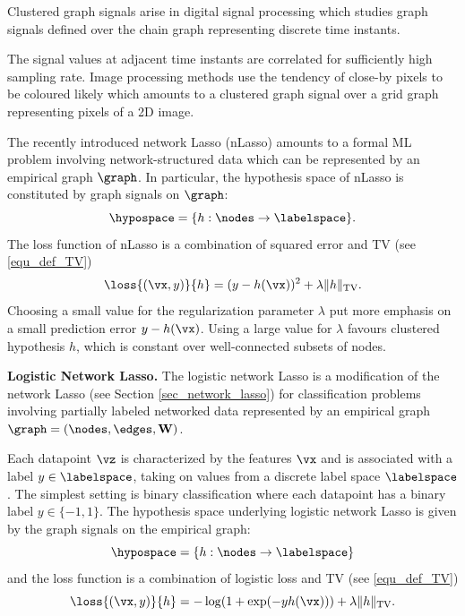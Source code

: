 \documentclass[12pt]{report}
\begin{document}
Clustered graph signals arise in digital signal processing which 
studies graph signals defined over the chain graph representing 
discrete time instants. 

The signal values at adjacent time instants are correlated 
for sufficiently high sampling rate. Image processing methods 
use the tendency of close-by pixels to be coloured likely 
which amounts to a clustered graph signal over a grid 
graph representing pixels of a 2D image.  

The recently introduced network Lasso (nLasso) amounts to a formal ML problem involving 
network-structured data which can be represented by an empirical graph $\graph$. In particular, 
the hypothesis space of nLasso is constituted by graph signals on $\graph$: 
\begin{equation}
\hypospace  = \{ h: \nodes \rightarrow \labelspace \}.
\end{equation} 
The loss function of nLasso is a combination of squared error and TV (see \eqref{equ_def_TV}) 
\begin{equation}
\loss{(\vx,y)}{h} = (y - h(\vx))^{2} + \lambda \| h  \|_{\rm TV}. 
\end{equation} 
Choosing a small value for the regularization parameter $\lambda$ put more emphasis 
on a small prediction error $y-h(\vx)$. Using a large value for $\lambda$ favours clustered 
hypothesis $h$, which is constant over well-connected subsets of nodes. 


{\bf Logistic Network Lasso.} The logistic network Lasso \cite{LogisticNLassoAsilomar2018,LogisticNLasso} 
is a modification of the network Lasso (see Section \ref{sec_network_lasso}) for classification problems 
involving partially labeled networked data represented by an empirical graph $\graph=(\nodes,\edges,\mathbf{W})$. 

Each datapoint $\vz$ is characterized by the features $\vx$ and is associated with a label $y \in \labelspace$, 
taking on values from a discrete label space $\labelspace$. The simplest setting is binary classification where 
each datapoint has a binary label $y \in \{-1,1\}$. The hypothesis space underlying logistic network Lasso 
is given by the graph signals on the empirical graph: 
\begin{equation}
\hypospace  = \{ h: \nodes \rightarrow \labelspace \}
\end{equation} 
and the loss function is a combination of logistic loss and TV (see \eqref{equ_def_TV})
\begin{equation}
\loss{(\vx,y)}{h} = -\log(1+ \exp(-yh(\vx))) + \lambda \| h  \|_{\rm TV}. 
\end{equation} 
\end{document}
